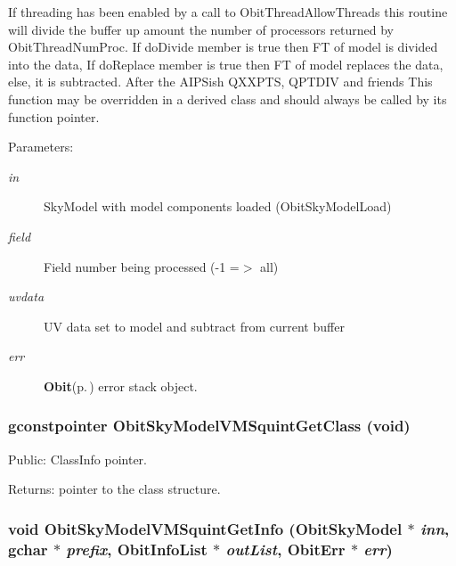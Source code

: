 If threading has been enabled by a call to Obit\-Thread\-Allow\-Threads this routine will divide the buffer up amount the number of processors returned by Obit\-Thread\-Num\-Proc. If do\-Divide member is true then FT of model is divided into the data, If do\-Replace member is true then FT of model replaces the data, else, it is subtracted. After the AIPSish QXXPTS, QPTDIV and friends This function may be overridden in a derived class and should always be called by its function pointer. \begin{Desc}
\item[Parameters:]
\begin{description}
\item[{\em in}]Sky\-Model with model components loaded (Obit\-Sky\-Model\-Load) \item[{\em field}]Field number being processed (-1 =$>$ all) \item[{\em uvdata}]UV data set to model and subtract from current buffer \item[{\em err}]{\bf Obit}{\rm (p.\,\pageref{structObit})} error stack object. \end{description}
\end{Desc}
\subsubsection{\setlength{\rightskip}{0pt plus 5cm}gconstpointer Obit\-Sky\-Model\-VMSquint\-Get\-Class (void)}\label{ObitSkyModelVMSquint_8c_a16}


Public: Class\-Info pointer. 

\begin{Desc}
\item[Returns:]pointer to the class structure. \end{Desc}
\subsubsection{\setlength{\rightskip}{0pt plus 5cm}void Obit\-Sky\-Model\-VMSquint\-Get\-Info ({\bf Obit\-Sky\-Model} $\ast$ {\em inn}, gchar $\ast$ {\em prefix}, {\bf Obit\-Info\-List} $\ast$ {\em out\-List}, {\bf Obit\-Err} $\ast$ {\em err})}\label{ObitSkyModelVMSquint_8c_a23}


